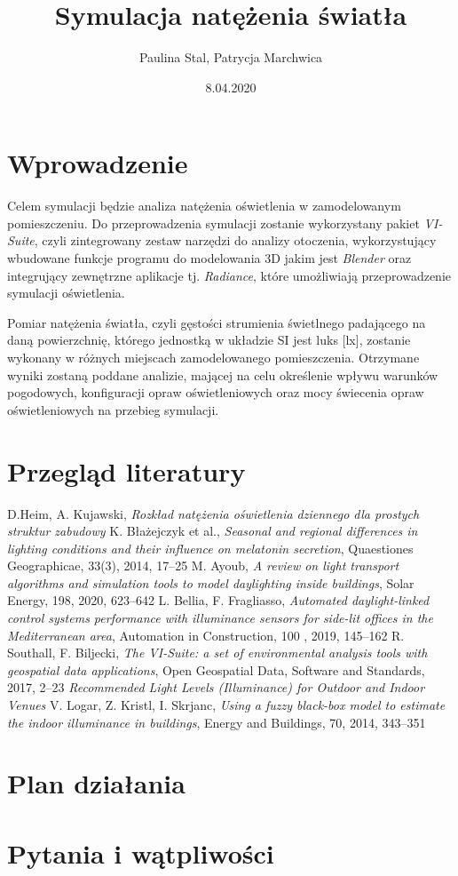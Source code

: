\documentclass[a4paper,12pt]{article}
\title{Symulacja natężenia światła}
\author{Paulina Stal, Patrycja Marchwica}
\date{8.04.2020}
\begin{document}
\maketitle

	\section{Wprowadzenie}
	\label{sec:wprowadzenie}
	
	Celem symulacji będzie analiza natężenia oświetlenia w zamodelowanym pomieszczeniu. Do przeprowadzenia symulacji zostanie wykorzystany pakiet \emph{VI-Suite}, czyli zintegrowany zestaw narzędzi do analizy otoczenia, wykorzystujący wbudowane funkcje programu do modelowania 3D jakim jest \emph{Blender} oraz integrujący zewnętrzne aplikacje tj. \emph{Radiance}, które umożliwiają przeprowadzenie symulacji oświetlenia.

	Pomiar natężenia światła, czyli gęstości strumienia świetlnego padającego na daną powierzchnię, którego jednostką w układzie SI jest luks [lx], zostanie wykonany w różnych miejscach zamodelowanego pomieszczenia. Otrzymane wyniki zostaną poddane analizie, mającej na celu określenie wpływu warunków pogodowych, konfiguracji opraw oświetleniowych oraz mocy świecenia opraw oświetleniowych na przebieg symulacji.  

	
	\section{Przegląd literatury}
	\label{sec:przeglad_literatury}
		\begin{thebibliography}{7}
			D.Heim, A. Kujawski, \textit{Rozkład natężenia oświetlenia dziennego dla prostych struktur zabudowy}
			K. Błażejczyk et al., \textit{Seasonal and regional differences in lighting conditions and their influence on melatonin secretion}, Quaestiones Geographicae, 33(3), 2014, 17--25
			M. Ayoub, \textit{A review on light transport algorithms and simulation tools to model daylighting inside buildings}, Solar Energy, 198, 2020, 623--642
			L. Bellia, F. Fragliasso, \textit{Automated daylight-linked control systems performance with illuminance sensors for side-lit offices in the Mediterranean area}, Automation in Construction, 100 , 2019, 145--162
			R. Southall, F. Biljecki, \textit{The VI-Suite: a set of environmental analysis tools with geospatial data applications}, Open Geospatial Data, Software and Standards, 2017, 2--23
			\textit{Recommended Light Levels (Illuminance) for Outdoor and Indoor Venues}
			V. Logar, Z. Kristl, I. Skrjanc, \textit{Using a fuzzy black-box model to estimate the indoor illuminance in buildings}, Energy and Buildings, 70, 2014, 343--351
			
		\end{thebibliography}
	
	\section{Plan działania}
	\label{sec:plan_dzialania}
	
	\section{Pytania i wątpliwości}
	\label{sec:pytania_watpliwosci}

	
\end{document}

